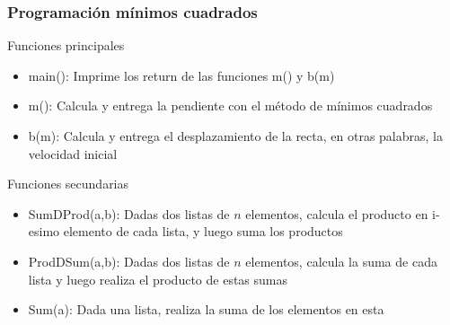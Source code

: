 \documentclass{beamer}
\begin{document}
\begin{frame}
    \frametitle{Programación mínimos cuadrados}



    
    \begin{block}{Funciones principales}
        \begin{itemize}[<+- | alert@+>]
            \item main(): Imprime los return de las funciones m() y b(m)
            \item m(): Calcula y entrega la pendiente con el método de mínimos cuadrados
            \item b(m): Calcula y entrega el desplazamiento de la recta, en otras palabras, la velocidad inicial
        \end{itemize}
    \end{block}


    \begin{block}{Funciones secundarias}
        \begin{itemize}[<+- | alert@+>]
            \item SumDProd(a,b): Dadas dos listas de $n$ elementos, calcula el producto en i-esimo elemento de cada lista, y luego suma los productos
            \item ProdDSum(a,b): Dadas dos listas de $n$ elementos, calcula la suma de cada lista y luego realiza el producto de estas sumas 
            \item Sum(a): Dada una lista, realiza la suma de los elementos en esta
        \end{itemize}
    \end{block}

\end{frame}
\end{document}
